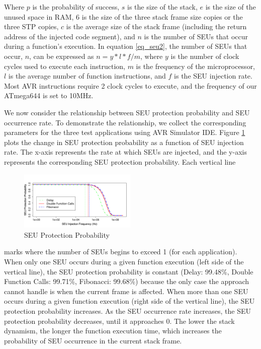 Where $p$ is the probability of success, $s$ is the size of the stack, $e$ is the size of the unused space in RAM, $6$ is the size of the three stack frame size copies or the three STP copies, $c$ is the average size of the stack frame (including the return address of the injected code segment), and $n$ is the number of SEUs that occur during a function's execution. In equation \ref{eq_seu2}, the number of SEUs that occur, $n$, can be expressed as $n=y*l*f/m$, where $y$ is the number of clock cycles used to execute each instruction, $m$ is the frequency of the microprocessor, $l$ is the average number of function instructions, and $f$ is the SEU injection rate. Most AVR instructions require 2 clock cycles to execute, and the frequency of our ATmega644 is set to 10MHz.

We now consider the relationship between SEU protection probability and SEU occurrence rate. To demonstrate the relationship, we collect the corresponding parameters for the three test applications using AVR Simulator IDE. Figure \ref{fig:success_probability} plots the change in SEU protection probability as a function of SEU injection rate. The x-axis represents the rate at which SEUs are injected, and the y-axis represents the corresponding SEU protection probability. Each vertical line 
\begin{figure}
	\vspace{-25pt}
	\begin{center}
		\includegraphics[width=0.5\textwidth, height=80pt]{figures/success_probability_v2.pdf}
	\end{center}
	\vspace{-15pt}
	\caption{SEU Protection Probability}
	\vspace{-25pt}
	\label{fig:success_probability}
\end{figure}
marks where the number of SEUs begins to exceed 1 (for each application). When only one SEU occurs during a given function execution (left side of the vertical line), the SEU protection probability is constant (Delay: 99.48\%, Double Function Calls: 99.71\%, Fibonacci: 99.68\%) because the only case the approach cannot handle is when the current frame is affected. When more than one SEU occurs during a given function execution (right side of the vertical line), the SEU protection probability increases. As the SEU occurrence rate increases, the SEU protection probability decreases, until it approaches 0. The lower the stack dynamism, the longer the function execution time, which increases the probability of SEU occurrence in the current stack frame.
\vspace{-15pt}
